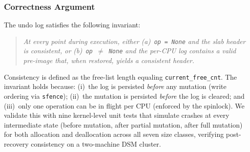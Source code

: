 \subsubsection{Correctness Argument}

The undo log satisfies the following invariant:

\begin{quote}
\emph{At every point during execution, either
\textup{(a)}~\texttt{op\,=\,None} and the slab header is consistent, or
\textup{(b)}~\texttt{op\,$\neq$\,None} and the per-CPU log contains a
valid pre-image that, when restored, yields a consistent header.}
\end{quote}

\noindent
Consistency is defined as the free-list length equaling
\texttt{current\_free\_cnt}.
The invariant holds because:
(i)~the log is persisted \emph{before} any mutation (write ordering via
\texttt{sfence});
(ii)~the mutation is persisted \emph{before} the log is cleared;
and (iii)~only one operation can be in flight per CPU (enforced by the
spinlock).
We validate this with nine kernel-level unit tests that simulate
crashes at every intermediate state
(before mutation, after partial mutation, after full mutation)
for both allocation and deallocation across all seven size classes,
verifying post-recovery consistency on a two-machine DSM cluster.
